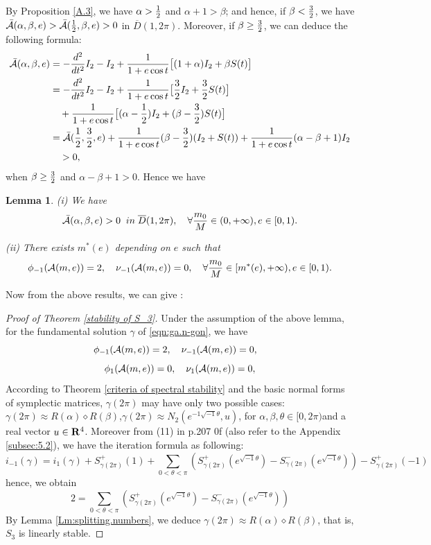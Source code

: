 \documentclass[11pt]{article}
\newtheorem{lemma}{Lemma}[section]
\def\R{{\bf R}}
\def\cA{{\cal A}}
\def\ol#1{\overline{#1}}
\begin{document}
By Proposition \ref{A.3},
we have $\alpha>{1\over2}$ and
$\alpha+1>\beta$;
and hence, if $\beta<{3\over2}$,
we have
$\bar\cA(\alpha,\beta,e)>\bar\cA({1\over2},\beta,e)>0$ in $\ol{D}(1,2\pi)$.
Moreover, if $\beta\ge{3\over2}$,
we can deduce the following formula:
\begin{align}
    \bar \cA(\alpha,\beta,e)&=-{d^2\over dt^2}I_2-I_2+{1\over1+e\cos{t}}\big[(1+\alpha)I_2+\beta S(t)\big]\\
    &=-{d^2\over dt^2}I_2-I_2+{1\over1+e\cos{t}}\big[{3\over 2}I_2+{3\over 2}S(t)\big]\\
    &\quad +{1\over1+e\cos{t}}\big[(\alpha-{1\over2})I_2+(\beta -{3 \over 2})S(t)\big]\\
    &=\bar\cA({1\over2},{3\over2},e)+{1\over1+e\cos{t}}(\beta-{3\over 2})(I_2+S(t))+{1\over1+e\cos{t}}(\alpha-\beta +1)I_2\\
    &\quad>0,
\end{align}
when $\beta\ge{3\over 2}$ and $\alpha-\beta+1>0.$ 
Hence we have
\begin{lemma}
    (i) We have
    \begin{equation}
    \bar\cA(\alpha,\beta,e)>0
    \;\;
    {\rm in}\;\ol{D}(1,2\pi),
    \quad
    \forall {m_0\over M}\in(0,+\infty),e\in[0,1).
    \end{equation}
    
    (ii) There exists $m^*(e)$ depending on $e$ such that
    \begin{equation}
    \phi_{-1}(\cA(m,e))=2,
    \quad
    \nu_{-1}(\cA(m,e))=0,
    \quad
    \forall {m_0\over M}\in[m^*(e),+\infty),e\in[0,1).
    \end{equation}
\end{lemma}
Now from the above results, we can give 
:
\begin{proof}[Proof of Theorem \ref{stability of S_3}]
Under the assumption of the above lemma, for the fundamental solution $\gamma$ of \eqref{eqn:ga.n-gon}, we have
$$
  \phi_{-1}(\cA({m,e}))=2,\quad
  \nu_{-1}(\cA({m,e}))=0,\quad$$
  $$
  \phi_1(\cA({m,e}))=0,\quad
  \nu_1(\cA(m,e))=0,
$$
According to Theorem \ref{criteria of spectral stability} and the basic normal forms of symplectic matrices, $\gamma(2\pi)$ may have only two possible cases: $\gamma(2\pi) \approx R(\alpha) \diamond R (\beta)$,$\gamma(2\pi) \approx N_2(e^{-1\sqrt{-1}\theta},u)$, for $\alpha,\beta, \theta \in [0,2\pi) $and a real vector $u\in\R^4$. Moreover from (11) in p.207 0f \cite{Lon4} (also refer to the Appendix \ref{subsec:5.2}), we have the iteration formula as following:
$$
i_{-1}(\gamma)=i_1(\gamma)+S^+_{\gamma(2\pi)}(1)+\sum_{0<\theta<\pi}(S^+_{\gamma(2\pi)}(e^{\sqrt{-1}\theta})-S^-_{\gamma(2\pi)}(e^{\sqrt{-1}\theta}))-S^+_{\gamma(2\pi)}(-1)
$$
hence, we obtain
$$
2=\sum_{0<\theta<\pi}(S^+_{\gamma(2\pi)}(e^{\sqrt{-1}\theta})-S^-_{\gamma(2\pi)}(e^{\sqrt{-1}\theta}))
$$
By Lemma \ref{Lm:splitting.numbers},
we deduce $\gamma(2\pi) \approx R(\alpha) \diamond R (\beta)$, that is, $S_3$ is linearly stable.
\end{proof}
\end{document}
